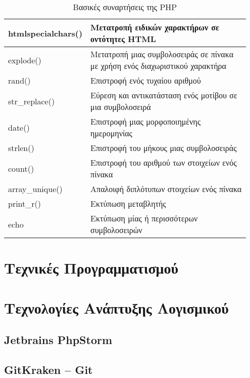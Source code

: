 \begin{table}[h]
\caption{Βασικές συναρτήσεις της PHP}
\label{tbl:php_basic_functions}
\begin{tabular}{|p{0.2\linewidth}|p{0.75\linewidth}|}
\hline
htmlspecialchars() & Μετατροπή ειδικών χαρακτήρων σε οντότητες HTML                               \\ \hline
explode()          & Μετατροπή μιας συμβολοσειράς σε πίνακα με χρήση ενός διαχωριστικού χαρακτήρα \\ \hline
rand()             & Επιστροφή ενός τυχαίου αριθμού                                               \\ \hline
str\_replace()     & Εύρεση και αντικατάσταση ενός μοτίβου σε μια συμβολοσειρά                    \\ \hline
date()             & Επιστροφή μιας μορφοποιημένης ημερομηνίας                                    \\ \hline
strlen()           & Επιστροφή του μήκους μιας συμβολοσειράς                                      \\ \hline
count()            & Επιστροφή του αριθμού των στοιχείων ενός πίνακα                              \\ \hline
array\_unique()    & Απαλοιφή διπλότυπων στοιχείων ενός πίνακα                                    \\ \hline
print\_r()         & Εκτύπωση μεταβλητής                                                          \\ \hline
echo               & Εκτύπωση μίας ή περισσότερων συμβολοσειρών                                   \\ \hline
\end{tabular}
\end{table}

\section{Τεχνικές Προγραμματισμού}

\section{Τεχνολογίες Ανάπτυξης Λογισμικού}

\subsection{Jetbrains PhpStorm}

\subsection{GitKraken – Git}
